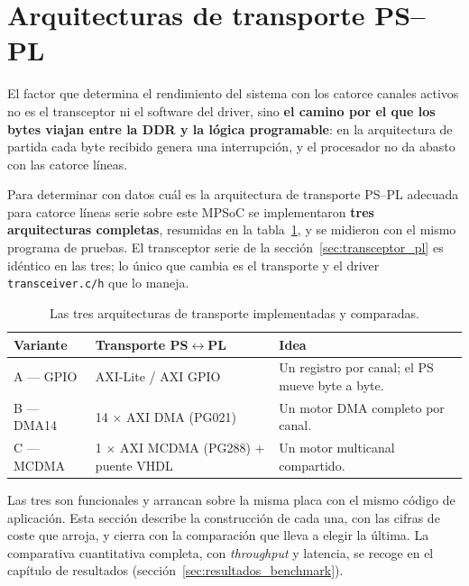 
\section{Arquitecturas de transporte PS--PL} \label{sec:transporte_desarrollo}

El factor que determina el rendimiento del sistema con los catorce canales activos no es el
transceptor ni el software del driver, sino \textbf{el camino por el que los bytes viajan entre la
DDR y la lógica programable}: en la arquitectura de partida cada byte recibido genera una
interrupción, y el procesador no da abasto con las catorce líneas.

Para determinar con datos cuál es la arquitectura de transporte PS--PL adecuada para catorce
líneas serie sobre este MPSoC se implementaron \textbf{tres arquitecturas completas}, resumidas
en la tabla~\ref{tab:tres_variantes}, y se midieron con el mismo programa de pruebas. El
transceptor serie de la sección~\ref{sec:transceptor_pl} es idéntico en las tres; lo único que
cambia es el transporte y el driver \texttt{transceiver.c/h} que lo maneja.

\begin{table}[H]
    \centering
    \begin{tabular}{p{2.9cm} p{5.0cm} p{6.1cm}}
        \hline
        \textbf{Variante} & \textbf{Transporte PS$\leftrightarrow$PL} & \textbf{Idea} \\
        \hline
        A --- GPIO & AXI-Lite / AXI GPIO & Un registro por canal; el PS mueve byte a byte. \\
        B --- DMA14 & 14 $\times$ AXI DMA (PG021) & Un motor DMA completo por canal. \\
        C --- MCDMA & 1 $\times$ AXI MCDMA (PG288) + puente VHDL & Un motor multicanal compartido. \\
        \hline
    \end{tabular}
    \caption{Las tres arquitecturas de transporte implementadas y comparadas.}
    \label{tab:tres_variantes}
\end{table}

Las tres son funcionales y arrancan sobre la misma placa con el mismo código de aplicación.
Esta sección describe la construcción de cada una, con las cifras de coste que arroja, y cierra
con la comparación que lleva a elegir la última. La comparativa cuantitativa completa, con
\textit{throughput} y latencia, se recoge en el capítulo de resultados
(sección~\ref{sec:resultados_benchmark}).

